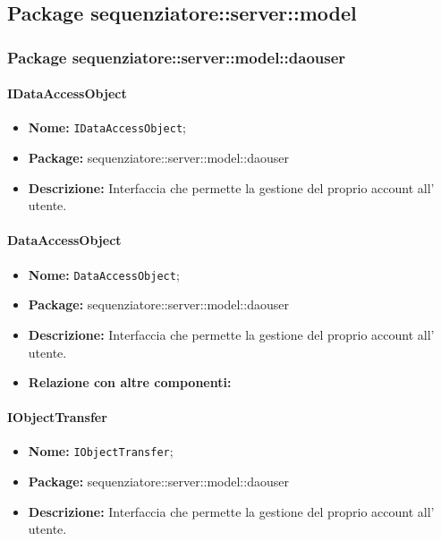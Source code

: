 \subsection{Package sequenziatore::server::model}
\subsubsection{Package sequenziatore::server::model::daouser}
\paragraph{IDataAccessObject}
	\begin{itemize}
		\item \textbf{Nome:} \texttt{IDataAccessObject};
		\item \textbf{Package:} sequenziatore::server::model::daouser
		\item \textbf{Descrizione:} Interfaccia che permette la gestione del proprio account all' utente.
	\end{itemize}
\paragraph{DataAccessObject}
	\begin{itemize}
		\item \textbf{Nome:} \texttt{DataAccessObject};
		\item \textbf{Package:} sequenziatore::server::model::daouser
		\item \textbf{Descrizione:} Interfaccia che permette la gestione del proprio account all' utente.
		\item \textbf{Relazione con altre componenti:}
	\end{itemize}
\paragraph{IObjectTransfer}
	\begin{itemize}
		\item \textbf{Nome:} \texttt{IObjectTransfer};
		\item \textbf{Package:} sequenziatore::server::model::daouser
		\item \textbf{Descrizione:} Interfaccia che permette la gestione del proprio account all' utente.
	\end{itemize}
